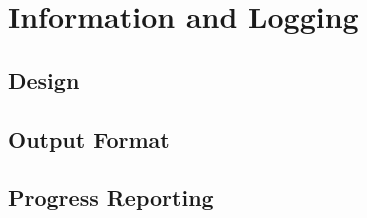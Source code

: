 \newpage
\section{Information and Logging}

\subsection{Design}

\subsection{Output Format}

\subsection{Progress Reporting}
